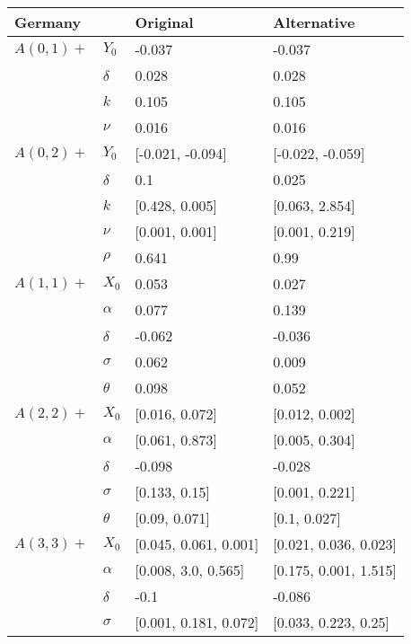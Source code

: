 \begin{tabular}{llll}
	\toprule
	Germany&       &               Original &            Alternative \\
	\midrule
	$A(0, 1)+$ & $Y_0$ &                 -0.037 &                 -0.037 \\
	& $\delta$ &                  0.028 &                  0.028 \\
	& $k$ &                  0.105 &                  0.105 \\
	& $\nu$ &                  0.016 &                  0.016 \\
	$A(0, 2)+$ & $Y_0$ &       [-0.021, -0.094] &       [-0.022, -0.059] \\
	& $\delta$ &                    0.1 &                  0.025 \\
	& $k$ &         [0.428, 0.005] &         [0.063, 2.854] \\
	& $\nu$ &         [0.001, 0.001] &         [0.001, 0.219] \\
	& $\rho$ &                  0.641 &                   0.99 \\
	$A(1, 1)+$ & $X_0$ &                  0.053 &                  0.027 \\
	& $\alpha$ &                  0.077 &                  0.139 \\
	& $\delta$ &                 -0.062 &                 -0.036 \\
	& $\sigma$ &                  0.062 &                  0.009 \\
	& $\theta$ &                  0.098 &                  0.052 \\
	$A(2, 2)+$ & $X_0$ &         [0.016, 0.072] &         [0.012, 0.002] \\
	& $\alpha$ &         [0.061, 0.873] &         [0.005, 0.304] \\
	& $\delta$ &                 -0.098 &                 -0.028 \\
	& $\sigma$ &          [0.133, 0.15] &         [0.001, 0.221] \\
	& $\theta$ &          [0.09, 0.071] &           [0.1, 0.027] \\
	$A(3, 3)+$ & $X_0$ &  [0.045, 0.061, 0.001] &  [0.021, 0.036, 0.023] \\
	& $\alpha$ &    [0.008, 3.0, 0.565] &  [0.175, 0.001, 1.515] \\
	& $\delta$ &                   -0.1 &                 -0.086 \\
	& $\sigma$ &  [0.001, 0.181, 0.072] &   [0.033, 0.223, 0.25] \\

\end{tabular}
